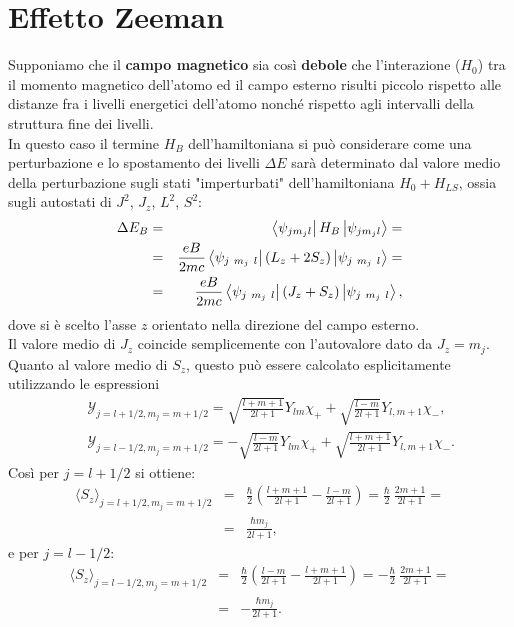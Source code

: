 \section{Effetto Zeeman}
Supponiamo che il \textbf{campo magnetico} sia così \textbf{debole} che l'interazione ($H_0$) tra il momento magnetico dell'atomo ed il campo esterno risulti piccolo rispetto alle distanze fra i livelli energetici dell'atomo nonché rispetto agli intervalli della struttura fine dei livelli. \\
In questo caso il termine $H_B$ dell'hamiltoniana si può considerare come una perturbazione e lo spostamento dei livelli $\Delta E$ sarà determinato dal valore medio della perturbazione sugli stati "imperturbati" dell'hamiltoniana $H_0+H_{LS}$, ossia sugli autostati di $J^2$, $J_z$, $L^2$, $S^2$:
\begin{eqnarray} \label{eq:cap24_5}
\Delta E_B &=& \bra{\psi_{jm_jl}} H_B \ket{\psi_{jm_jl}}= \nonumber \\
& = &\frac{eB}{2mc} \bra{\psi_{j\ m_j\ l}} \left( L_z+2S_z \right)\ket{\psi_{j\ m_j\ l}}= \nonumber\\
& =& \frac{eB}{2mc} \bra{\psi_{j\ m_j\ l}} \left( J_z+S_z \right)\ket{\psi_{j\ m_j\ l}} ,
\end{eqnarray} 
dove si è scelto l'asse $z$ orientato nella direzione del campo esterno. \\
Il valore medio di $J_z$ coincide semplicemente con l'autovalore dato da $J_z=m_j$. Quanto al valore medio di $S_z$, questo può essere calcolato esplicitamente utilizzando le espressioni
\begin{eqnarray}
& & \mathcal{Y}_{j=l+1/2,m_j=m+1/2}=\sqrt{\frac{l+m+1}{2l+1}}Y_{lm}\chi_{+} + \sqrt{\frac{l-m}{2l+1}}Y_{l,m+1}\chi_{-} ,\\
&  &\mathcal{Y}_{j=l-1/2,m_j=m+1/2}=-\sqrt{\frac{l-m}{2l+1}}Y_{lm}\chi_{+} + \sqrt{\frac{l+m+1}{2l+1}}Y_{l,m+1}\chi_{-} .
\end{eqnarray}
Così per $j=l+1/2$ si ottiene:
\begin{eqnarray}
\langle S_z \rangle_{j=l+1/2,m_j=m+1/2} & =& \frac{\hbar}{2} \left( \frac{l+m+1}{2l+1}-\frac{l-m}{2l+1} \right)=\frac{\hbar}{2} \ \frac{2m+1}{2l+1}=  \nonumber \\
& = & \frac{\hbar m_j}{2l+1} ,
\end{eqnarray}
e per $j=l-1/2$:
\begin{eqnarray}
\langle S_z \rangle_{j=l-1/2,m_j=m+1/2} & = &\frac{\hbar}{2} \left( \frac{l-m}{2l+1}-\frac{l+m+1}{2l+1} \right)=-\frac{\hbar}{2} \ \frac{2m+1}{2l+1}=  \nonumber \\
& =& -\frac{\hbar m_j}{2l+1} .
\end{eqnarray}
